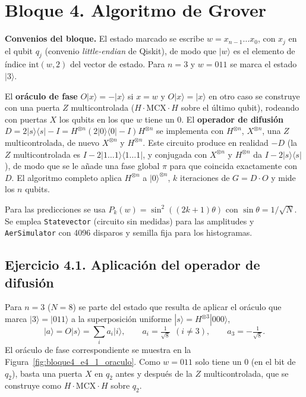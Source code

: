 \section{Bloque 4. Algoritmo de Grover}\label{sec:bloque_4}

\textbf{Convenios del bloque.} El estado marcado se escribe $w=x_{n-1}\dots x_0$, con $x_j$ en el qubit $q_j$ (convenio \emph{little-endian} de Qiskit), de modo que $|w\rangle$
es el elemento de índice $\mathrm{int}(w,2)$ del vector de estado. Para $n=3$ y $w=011$ se marca el estado $|3\rangle$.

El \textbf{oráculo de fase} $O|x\rangle=-|x\rangle$ si $x=w$ y $O|x\rangle=|x\rangle$ en otro caso se construye con una puerta $Z$ multicontrolada
($H\cdot\mathrm{MCX}\cdot H$ sobre el último qubit), rodeando con puertas $X$ los qubits en los que $w$ tiene un 0. El \textbf{operador de difusión}
$D=2|s\rangle\langle s|-I=H^{\otimes n}(2|0\rangle\langle0|-I)H^{\otimes n}$ se implementa con $H^{\otimes n}$, $X^{\otimes n}$, una $Z$ multicontrolada, de nuevo $X^{\otimes n}$ y $H^{\otimes n}$.
Este circuito produce en realidad $-D$ (la $Z$ multicontrolada es $I-2|1\dots1\rangle\langle1\dots1|$, y conjugada con $X^{\otimes n}$ y $H^{\otimes n}$ da $I-2|s\rangle\langle s|$), de modo que se le añade una fase global $\pi$ para que
coincida exactamente con $D$. El algoritmo completo aplica $H^{\otimes n}$ a $|0\rangle^{\otimes n}$, $k$ iteraciones de $G=D\cdot O$ y mide los $n$ qubits.

Para las predicciones se usa $P_k(w)=\sin^2((2k+1)\theta)$ con $\sin\theta=1/\sqrt{N}$. Se emplea \texttt{Statevector} (circuito sin medidas) para las amplitudes y
\texttt{AerSimulator} con 4096 disparos y semilla fija para los histogramas.

\subsection{Ejercicio 4.1. Aplicación del operador de difusión}
Para $n=3$ ($N=8$) se parte del estado que resulta de aplicar el oráculo que marca $|3\rangle=|011\rangle$ a la superposición uniforme $|s\rangle=H^{\otimes3}|000\rangle$,
$$|a\rangle=O|s\rangle=\sum_i a_i|i\rangle,\qquad a_i=\tfrac{1}{\sqrt8}\ \ (i\neq3),\qquad a_3=-\tfrac{1}{\sqrt8}.$$
El oráculo de fase correspondiente se muestra en la Figura~\ref{fig:bloque4_e4_1_oraculo}. Como $w=011$ solo tiene un 0 (en el bit de $q_2$), basta una puerta $X$ en $q_2$ antes y después de la $Z$ multicontrolada, que se construye como $H\cdot\mathrm{MCX}\cdot H$ sobre $q_2$.

